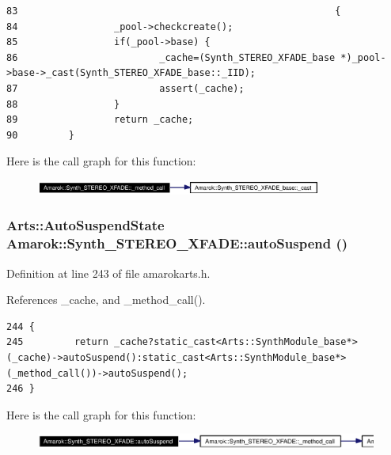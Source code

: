 \footnotesize\begin{verbatim}83                                                        {
84                 _pool->checkcreate();
85                 if(_pool->base) {
86                         _cache=(Synth_STEREO_XFADE_base *)_pool->base->_cast(Synth_STEREO_XFADE_base::_IID);
87                         assert(_cache);
88                 }
89                 return _cache;
90         }
\end{verbatim}\normalsize 


Here is the call graph for this function:\begin{figure}[H]
\begin{center}
\leavevmode
\includegraphics[width=266pt]{classAmarok_1_1Synth__STEREO__XFADE_Amarok_1_1Synth__STEREO__XFADEd0_cgraph}
\end{center}
\end{figure}
\subsubsection{\setlength{\rightskip}{0pt plus 5cm}Arts::Auto\-Suspend\-State Amarok::Synth\_\-STEREO\_\-XFADE::auto\-Suspend ()\hspace{0.3cm}{\tt  [inline]}}\label{classAmarok_1_1Synth__STEREO__XFADE_Amarok_1_1Synth__STEREO__XFADEa9}




Definition at line 243 of file amarokarts.h.

References \_\-cache, and \_\-method\_\-call().



\footnotesize\begin{verbatim}244 {
245         return _cache?static_cast<Arts::SynthModule_base*>(_cache)->autoSuspend():static_cast<Arts::SynthModule_base*>(_method_call())->autoSuspend();
246 }
\end{verbatim}\normalsize 


Here is the call graph for this function:\begin{figure}[H]
\begin{center}
\leavevmode
\includegraphics[width=401pt]{classAmarok_1_1Synth__STEREO__XFADE_Amarok_1_1Synth__STEREO__XFADEa9_cgraph}
\end{center}
\end{figure}
